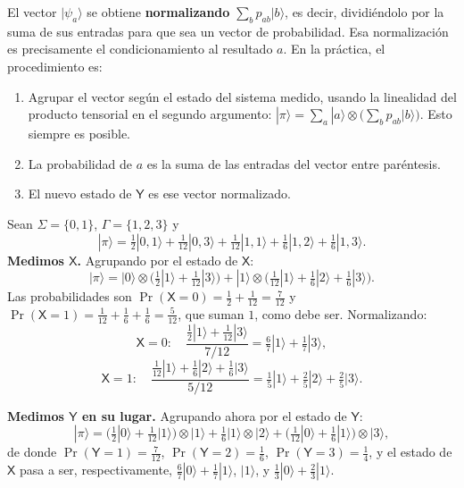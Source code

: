 \documentclass[11pt, a4paper, twoside, openright]{report}
\begin{document}
\noindent El vector $|\psi_a\rangle$ se obtiene \textbf{normalizando} $\sum_b p_{ab}|b\rangle$, es decir, dividiéndolo por la suma de sus entradas para que sea un vector de probabilidad. Esa normalización es precisamente el condicionamiento al resultado $a$. En la práctica, el procedimiento es:
\begin{enumerate}
    \item Agrupar el vector según el estado del sistema medido, usando la linealidad del producto tensorial en el segundo argumento: $|\pi\rangle = \sum_a |a\rangle \otimes \big(\sum_b p_{ab}|b\rangle\big)$. Esto siempre es posible.
    \item La probabilidad de $a$ es la suma de las entradas del vector entre paréntesis.
    \item El nuevo estado de $\mathsf{Y}$ es ese vector normalizado.
\end{enumerate}

\begin{tcolorbox}[colback=cyan!5!white,colframe=cyan!75!black,title=\textbf{Ejemplo: Medición parcial}]
Sean $\Sigma = \{0,1\}$, $\Gamma = \{1,2,3\}$ y
\[ |\pi\rangle = \tfrac12|0,1\rangle + \tfrac1{12}|0,3\rangle + \tfrac1{12}|1,1\rangle + \tfrac16|1,2\rangle + \tfrac16|1,3\rangle. \]
\textbf{Medimos $\mathsf{X}$.} Agrupando por el estado de $\mathsf{X}$:
\[ |\pi\rangle = |0\rangle\otimes\Big(\tfrac12|1\rangle + \tfrac1{12}|3\rangle\Big) + |1\rangle\otimes\Big(\tfrac1{12}|1\rangle + \tfrac16|2\rangle + \tfrac16|3\rangle\Big). \]
Las probabilidades son $\Pr(\mathsf{X}=0) = \frac12 + \frac1{12} = \frac7{12}$ y $\Pr(\mathsf{X}=1) = \frac1{12}+\frac16+\frac16 = \frac5{12}$, que suman $1$, como debe ser. Normalizando:
\[ \mathsf{X}=0:\quad \frac{\frac12|1\rangle + \frac1{12}|3\rangle}{7/12} = \tfrac67|1\rangle + \tfrac17|3\rangle, \]
\[ \mathsf{X}=1:\quad \frac{\frac1{12}|1\rangle + \frac16|2\rangle + \frac16|3\rangle}{5/12} = \tfrac15|1\rangle + \tfrac25|2\rangle + \tfrac25|3\rangle. \]

\textbf{Medimos $\mathsf{Y}$ en su lugar.} Agrupando ahora por el estado de $\mathsf{Y}$:
\[ |\pi\rangle = \Big(\tfrac12|0\rangle + \tfrac1{12}|1\rangle\Big)\otimes|1\rangle + \tfrac16|1\rangle\otimes|2\rangle + \Big(\tfrac1{12}|0\rangle + \tfrac16|1\rangle\Big)\otimes|3\rangle, \]
de donde $\Pr(\mathsf{Y}=1) = \frac7{12}$, $\Pr(\mathsf{Y}=2) = \frac16$, $\Pr(\mathsf{Y}=3) = \frac14$, y el estado de $\mathsf{X}$ pasa a ser, respectivamente, $\frac67|0\rangle + \frac17|1\rangle$, \; $|1\rangle$, \; y $\frac13|0\rangle + \frac23|1\rangle$.
\end{tcolorbox}
\end{document}
